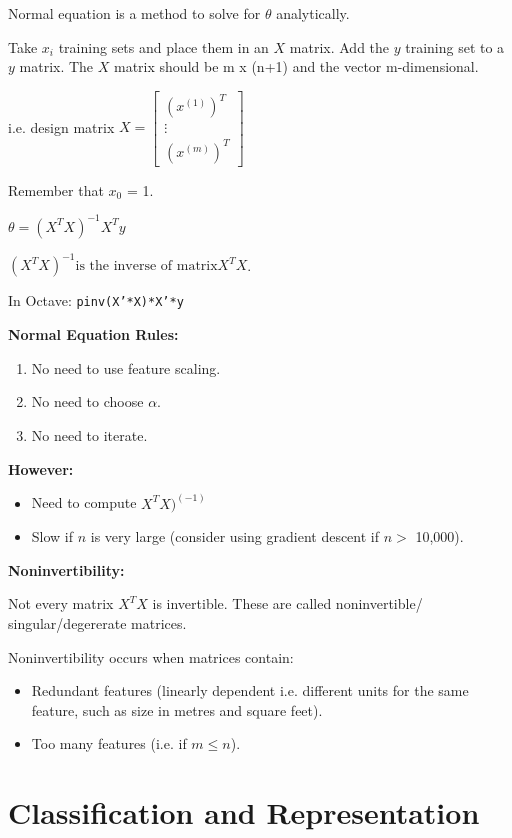\documentclass[12pt] {article}
\begin{document}
  Normal equation is a method to solve for $\theta$ analytically.

  Take $x_i$ training sets and place them in an $X$ matrix. Add the $y$ 
    training set to a $y$ matrix. The $X$ matrix should be m x (n+1) and the
    vector m-dimensional. 

  i.e. design matrix $X = \begin{bmatrix} (x^{(1)})^T \\ \vdots \\ 
    (x^{(m)})^T \end{bmatrix}$

  Remember that $x_0$ = 1.
  
  $\theta = (X^TX)^{-1}X^Ty$

  $(X^TX)^{-1} \text{is the inverse of matrix} X^TX$.

  In Octave: \texttt{pinv(X'*X)*X'*y}

  \textbf{Normal Equation Rules:}
  \begin{enumerate}
    \item No need to use feature scaling.
    \item No need to choose $\alpha$.
    \item No need to iterate.
  \end{enumerate}

  \newpage

  \textbf{However:}
  \begin{itemize}
    \item Need to compute $X^TX)^{(-1)}$
    \item Slow if $n$ is very large (consider using gradient descent if
      $n >$ 10,000).
  \end{itemize}

  \textbf{Noninvertibility:}

  Not every matrix $X^TX$ is invertible. These are called noninvertible/\\
  singular/degererate matrices.

  Noninvertibility occurs when matrices contain:
  \begin{itemize}
    \item Redundant features (linearly dependent i.e. different units for 
          the same feature, such as size in metres and square feet).
    \item Too many features (i.e. if $m \leq n$).
  \end{itemize}

    \newpage

\section{Classification and Representation}
\end{document}
